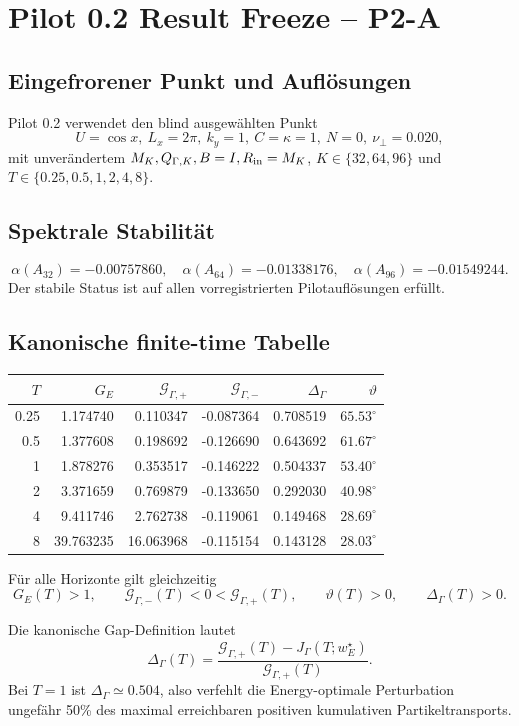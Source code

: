 \section{Pilot 0.2 Result Freeze -- P2-A}
\subsection{Eingefrorener Punkt und Auflösungen}
Pilot 0.2 verwendet den blind ausgewählten Punkt
\[
U=\cos x,\ L_x=2\pi,\ k_y=1,\ C=\kappa=1,\ N=0,\ \nu_\perp=0.020,
\]
mit unverändertem $M_K,Q_{\Gamma,K},B=I,R_{\rm in}=M_K$, $K\in\{32,64,96\}$ und $T\in\{0.25,0.5,1,2,4,8\}$.

\subsection{Spektrale Stabilität}
\[
\alpha(A_{32})=-0.00757860,
\quad
\alpha(A_{64})=-0.01338176,
\quad
\alpha(A_{96})=-0.01549244.
\]
Der stabile Status ist auf allen vorregistrierten Pilotauflösungen erfüllt.

\subsection{Kanonische finite-time Tabelle}
\begin{center}
\small
\begin{tabular}{rrrrrr}
\toprule
$T$ & $G_E$ & $\mathcal G_{\Gamma,+}$ & $\mathcal G_{\Gamma,-}$ & $\Delta_\Gamma$ & $\vartheta$\\
\midrule
0.25 & 1.174740 & 0.110347 & -0.087364 & 0.708519 & $65.53^\circ$\\
0.5 & 1.377608 & 0.198692 & -0.126690 & 0.643692 & $61.67^\circ$\\
1 & 1.878276 & 0.353517 & -0.146222 & 0.504337 & $53.40^\circ$\\
2 & 3.371659 & 0.769879 & -0.133650 & 0.292030 & $40.98^\circ$\\
4 & 9.411746 & 2.762738 & -0.119061 & 0.149468 & $28.69^\circ$\\
8 & 39.763235 & 16.063968 & -0.115154 & 0.143128 & $28.03^\circ$\\
\bottomrule
\end{tabular}
\end{center}
Für alle Horizonte gilt gleichzeitig
\[
G_E(T)>1,
\qquad
\mathcal G_{\Gamma,-}(T)<0<\mathcal G_{\Gamma,+}(T),
\qquad
\vartheta(T)>0,
\qquad
\Delta_\Gamma(T)>0.
\]

Die kanonische Gap-Definition lautet
\[
\boxed{\Delta_\Gamma(T)=\frac{\mathcal G_{\Gamma,+}(T)-J_\Gamma(T;w_E^\star)}{\mathcal G_{\Gamma,+}(T)}}.
\]
Bei $T=1$ ist $\Delta_\Gamma\simeq0.504$, also verfehlt die Energy-optimale Perturbation ungefähr 50\% des maximal erreichbaren positiven kumulativen Partikeltransports.

